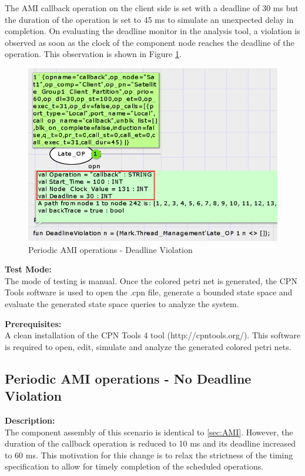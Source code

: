 The AMI callback operation on the client side is set with a deadline of 30 ms but the duration of the operation is set to 45 ms to simulate an unexpected delay in completion. On evaluating the deadline monitor in the analysis tool, a violation is observed as soon as the clock of the component node reaches the deadline of the operation. This observation is shown in Figure \ref{fig:Periodic_AMI_DV}.

\begin{figure}[htb]
\centering
\includegraphics[scale=0.45]{./figs/CPN_Periodic_AMI_DV.png}
\caption{Periodic AMI operations - Deadline Violation}
\label{fig:Periodic_AMI_DV}
\end{figure}

\noindent\textbf{Test Mode:}\\
The mode of testing is manual. Once the colored petri net is generated, the CPN Tools software is used to open the .cpn file, generate a bounded state space and evaluate the generated state space queries to analyze the system.

\noindent\textbf{Prerequisites:}\\
A clean installation of the CPN Tools 4 tool (http://cpntools.org/). This software is required to open, edit, simulate and analyze the generated colored petri nets. 

\subsection{Periodic AMI operations - No Deadline Violation}
\noindent\textbf{Description:}\\
The component assembly of this scenario is identical to \ref{sec:AMI}. However, the duration of the callback operation is reduced to 10 ms and its deadline increased to 60 ms. This motivation for this change is to relax the strictness of the timing specification to allow for timely completion of the scheduled operations. 

